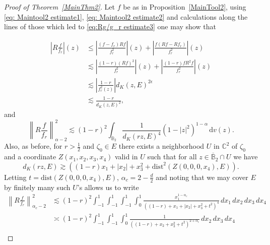 \documentclass[10pt,a4paper]{amsart}
\def\B{\mathbb{B}}
\def\C{\mathbb C}
\begin{document}
\begin{proof} [Proof of Theorem~\ref{MainThm2}]
    Let $f$ be as in Proposition~{\ref{MainTool2}}, using \eqref{eq: Maintool2 estimate1}, \eqref{eq: Maintool2 estimate2} and calculations along the lines of those which led to \eqref{eq:Rg/g_r estimate3} one may show that

    \begin{equation} \label{eq: Rg/g_r estimate2}
    \begin{aligned}
        \left| R \frac{f}{f_r} \right|(z) &\leq  \left|  \frac{(f-f_r) Rf}{f^2_r} \right|(z) + \left|  \frac{ f (Rf - Rf_r) }{f^2_r} \right|(z) \\
        &\lesssim \left|  \frac{(1-r) (Rf)^2}{f^2_r} \right|(z) + \left|  \frac{ (1-r) f R^2f }{f^2_r} \right|(z) \\
        &\lesssim \left|\frac{1-r}{f^2_r(z)}\right| d_K(z,E)^{2 \epsilon}    \\
        &\lesssim \frac{1-r}{d_K(z,E)^2},
    \end{aligned}
    \end{equation}
    and
    \begin{equation} \label{eq: shabih2}
        \left\| R \frac{f}{f_r} \right\|_{\alpha - 2}^2 \lesssim (1-r)^2 \int_{\B_2}  \frac{1}{d_K(rz,E)^{4}}   (1-|z|^2)^{1-\alpha}\, \mathrm{d}v(z).
    \end{equation}
    Also, as before, for $r > \frac{1}{2}$ and $\zeta_0 \in E$ there exists a neighborhood $U$ in $\C^2$ of $\zeta_0$ and a coordinate $Z(x_1,x_2,x_3,x_4)$ valid in $U$ such that for all $z \in \overline{\B}_2 \cap U$ we have
    \begin{equation*}
        d_K(rz,E) \gtrsim \left((1-r)x_1 +|x_2| + x_3^2 + \mathrm{dist}^2(Z(0,0,0,x_4),E)\right).
    \end{equation*}
    Letting $t = \mathrm{dist}(Z(0,0,0,x_4),E)$, $\alpha_c = 2 -\frac{d}{2}$ and noting that we may cover $E$ by finitely many such $U$'s allows us to write
    \begin{equation}
        \begin{aligned}
            \left\| R \frac{f}{f_r} \right\|^2_{\alpha_c - 2}
        &\lesssim (1 - r)^2 \int_{-1}^1 \int_{-1}^1 \int_{-1}^1 \int_0^1 
        \frac{x_1^{1 - \alpha_c}}{((1-r) + x_1 + |x_2| + x_3^2 + t^2)^{4}} \, dx_1\, dx_2\, dx_3\, dx_4 \\
        &\asymp (1 - r)^2 \int_{-1}^1 \int_{-1}^1 \int_{0}^1  
        \frac{1}{((1-r) + x_2 + x_3^2 + t^2)^{2 + \alpha_c}} \, dx_2\, dx_3\, dx_4 \\

\end{aligned}
\end{equation}
\end{proof}
\end{document}

